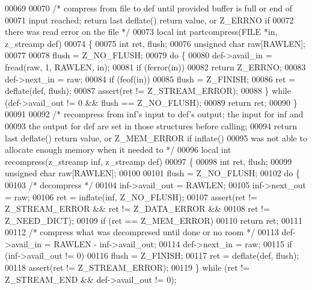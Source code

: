 \begin{DoxyCode}
{00069 
00070 \textcolor{comment}{/* compress from file to def until provided buffer is full or end of}
00071 \textcolor{comment}{   input reached; return last deflate() return value, or Z\_ERRNO if}
00072 \textcolor{comment}{   there was read error on the file */}
00073 local \textcolor{keywordtype}{int} partcompress(FILE *in, z\_streamp def)
00074 \{
00075     \textcolor{keywordtype}{int} ret, flush;
00076     \textcolor{keywordtype}{unsigned} \textcolor{keywordtype}{char} raw[RAWLEN];
00077 
00078     flush = Z\_NO\_FLUSH;
00079     \textcolor{keywordflow}{do} \{
00080         def->avail\_in = fread(raw, 1, RAWLEN, in);
00081         \textcolor{keywordflow}{if} (ferror(in))
00082             \textcolor{keywordflow}{return} Z\_ERRNO;
00083         def->next\_in = raw;
00084         \textcolor{keywordflow}{if} (feof(in))
00085             flush = Z\_FINISH;
00086         ret = deflate(def, flush);
00087         assert(ret != Z\_STREAM\_ERROR);
00088     \} \textcolor{keywordflow}{while} (def->avail\_out != 0 && flush == Z\_NO\_FLUSH);
00089     \textcolor{keywordflow}{return} ret;
00090 \}
00091 
00092 \textcolor{comment}{/* recompress from inf's input to def's output; the input for inf and}
00093 \textcolor{comment}{   the output for def are set in those structures before calling;}
00094 \textcolor{comment}{   return last deflate() return value, or Z\_MEM\_ERROR if inflate()}
00095 \textcolor{comment}{   was not able to allocate enough memory when it needed to */}
00096 local \textcolor{keywordtype}{int} recompress(z\_streamp inf, z\_streamp def)
00097 \{
00098     \textcolor{keywordtype}{int} ret, flush;
00099     \textcolor{keywordtype}{unsigned} \textcolor{keywordtype}{char} raw[RAWLEN];
00100 
00101     flush = Z\_NO\_FLUSH;
00102     \textcolor{keywordflow}{do} \{
00103         \textcolor{comment}{/* decompress */}
00104         inf->avail\_out = RAWLEN;
00105         inf->next\_out = raw;
00106         ret = inflate(inf, Z\_NO\_FLUSH);
00107         assert(ret != Z\_STREAM\_ERROR && ret != Z\_DATA\_ERROR &&
00108                ret != Z\_NEED\_DICT);
00109         \textcolor{keywordflow}{if} (ret == Z\_MEM\_ERROR)
00110             \textcolor{keywordflow}{return} ret;
00111 
00112         \textcolor{comment}{/* compress what was decompresed until done or no room */}
00113         def->avail\_in = RAWLEN - inf->avail\_out;
00114         def->next\_in = raw;
00115         \textcolor{keywordflow}{if} (inf->avail\_out != 0)
00116             flush = Z\_FINISH;
00117         ret = deflate(def, flush);
00118         assert(ret != Z\_STREAM\_ERROR);
00119     \} \textcolor{keywordflow}{while} (ret != Z\_STREAM\_END && def->avail\_out != 0);
}
\end{DoxyCode}
